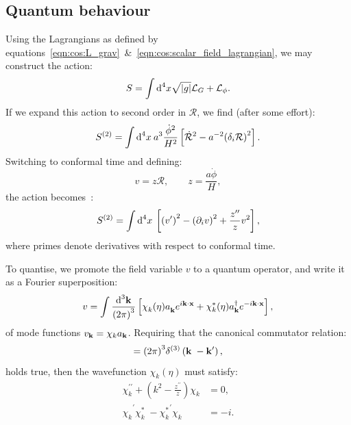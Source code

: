 \subsection{Quantum behaviour}
Using the Lagrangians as defined by equations~\eqref{eqn:cos:L_grav}~\&~\eqref{eqn:cos:scalar_field_lagrangian}, we may construct the action:
\begin{equation}
  S = \int \d[4]{x}\sqrt{|g|}\mathcal{L}_G + \mathcal{L}_\phi.
\end{equation}
If we expand this action to second order in \(\mathcal{R}\), we find (after some effort):
\begin{equation}
  S^{(2)} = \int \d[4]{x}\: a^3 \frac{\dot{\phi}^2}{H^2}\left[ \mathcal{\dot{R}}^2 -a^{-2}{\left( \delta_i\mathcal{R} \right)}^2 \right].
\end{equation}
Switching to conformal time and defining:
\begin{equation}
  v = z \mathcal{R}, \qquad
  z = \frac{a \dot{\phi}}{H},
\end{equation}
the action becomes~\citep[App B]{Baumann+2009}:
\begin{equation}
  S^{(2)} = \int \d[4]{x}\: \left[ {\left( v^{\prime} \right)}^2 - {\left( \partial_i v \right)}^2 + \frac{z^{\prime\prime}}{z}v^2\right],
\end{equation}
where primes denote derivatives with respect to conformal time.

To quantise, we promote the field variable \(v\) to a quantum operator, and write it as a Fourier superposition:
\begin{equation}
  v = \int \frac{\d[3]{\vk}}{{\left( 2\pi \right)}^3}
  \left[ 
    \chi_k^{\phantom\ast}(\eta) a_\vk^{\phantom\dagger}e^{i\vk\cdot\vx} + 
    \chi_k^\ast(\eta) a_\vk^{\dagger}e^{-i\vk\cdot\vx}  
  \right],
  \label{eqn:cos:mode_func_sum}
\end{equation}
of mode functions \(v_\vk = \chi_k a_\vk\).
Requiring that the canonical commutator relation:
\begin{equation}
  [ a_{\vk^{\phantom\prime}}^{\phantom\dagger}, a_{\vk^{\prime}}^{\dagger}] = {\left( 2\pi \right)}^3\delta^{(3)}\left( \vk^{\phantom\prime}-\vk^{\prime} \right),
  \label{eqn:cos:commutator}
\end{equation}
holds true, then the wavefunction \(\chi_k(\eta)\) must satisfy:
\begin{align}
  \chi_k^{\prime\prime} + \left( k^2 - \frac{z^{\prime\prime}}{z} \right) \chi_k &=0,
  \label{eqn:cos:mode_func}
  \\
  {\chi_k^{\phantom\ast}}^{\prime} 
  {\chi_k^{\ast}}^{\phantom\prime} 
  -
  {\chi_k^{\ast}}^{\prime} 
  {\chi_k^{\phantom\ast}}^{\phantom\prime} 
  &= -i.
  \label{eqn:cos:mode_func_normalisation}
\end{align}
